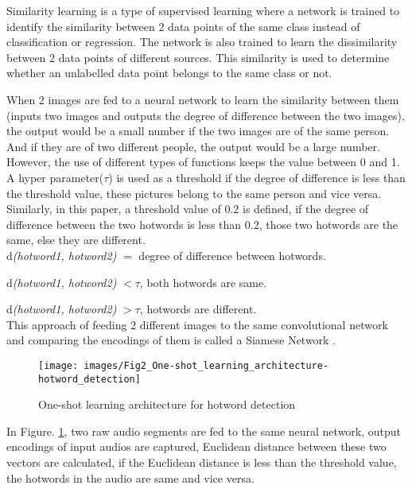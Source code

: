 \documentclass[10pt,twocolumn]{article}
\begin{document}
Similarity learning is a type of supervised learning where a network is trained to identify the similarity between 2 data points of the same class instead of classification or regression. The network is also trained to learn the dissimilarity between 2 data points of different sources. This similarity is used to determine whether an unlabelled data point belongs to the same class or not.

When 2 images are fed to a neural network to learn the similarity between them (inputs two images and outputs the degree of difference between the two images), the output would be a small number if the two images are of the same person. And if they are of two different people, the output would be a large number. However, the use of different types of functions keeps the value between 0 and 1. A hyper parameter($\tau$) is used as a threshold if the degree of difference is less than the threshold value, these pictures belong to the same person and vice versa. Similarly, in this paper, a threshold value of 0.2 is defined, if the degree of difference between the two hotwords is less than 0.2, those two hotwords are the same, else they are different.
\\

d\emph{(hotword1, hotword2)} $=$ degree of difference between hotwords.

d\emph{(hotword1, hotword2)}  $ < \tau$, both hotwords are same.

d\emph{(hotword1, hotword2)}  $ > \tau$, hotwords are different. 
\\


This approach of feeding 2 different images to the same convolutional network and comparing the encodings of them is called a Siamese Network \cite{Vargas_2020}.

\begin{figure} 
\centering
	\texttt{[image: images/Fig2\_One-shot\_learning\_architecture-hotword\_detection]}
\caption{One-shot learning architecture for hotword detection}
\label{FIG:OneshotLearningArchitecture}
\end{figure}

In Figure. \ref{FIG:OneshotLearningArchitecture}, two raw audio segments are fed to the same neural network, output encodings of input audios are captured, Euclidean distance between these two vectors are calculated, if the Euclidean distance is less than the threshold value, the hotwords in the audio are same and vice versa.

\label{Sec:efficientword-net}
\end{document}
